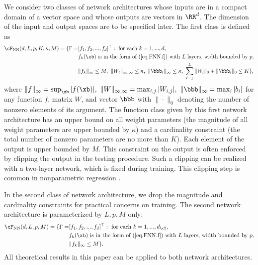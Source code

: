 \documentclass[11pt]{article} %
\newcommand{\hao}[1]{{\color{blue} #1}}
\begin{document}
We consider two classes of network architectures whose inputs are in a compact domain of a vector space and whose outputs are vectors in $\RR^d$. The dimension of the input and output spaces are to be specified later. The first class is defined as
\begin{align}
	\cF_{\rm NN}(d,L,p,K,\kappa,M)=\{\Gamma=&[f_1, f_2,...,f_{d}]^{\top}: \mbox{ for each }k=1,...,d,\nonumber\\
	&f_k(\xb) \mbox{ is in the form of (\ref{eq.FNN.f}) with } L \mbox{ layers, width bounded by } p, \nonumber\\
	& \|f_k\|_{\infty}\leq M, \ \|W_l\|_{\infty,\infty}\leq \kappa, \ \|\bbb_l\|_{\infty}\leq \kappa,\  \sum_{l=1}^L \|W_l\|_0+\|\bbb_l\|_0\leq K   \},
	\label{eq.FNN}
\end{align}
where
$
\|f\|_{\infty}=\sup_{\xb} |f(\xb)|,\ \|W\|_{\infty,\infty}=\max_{i,j} |W_{i,j}|,\ \|\bbb\|_{\infty}=\max_i |b_i|
$
for any function $f$, matrix $W$, and vector $\bbb$ with $\|\cdot\|_0$ denoting the number of nonzero elements of its argument. 
%
The function class given by this first network architecture has an upper bound on all weight parameters (the magnitude of all weight parameters are upper bounded by $\kappa$) and a cardinality constraint (the total number of nonzero parameters are no more than $K$). Each element of the output is upper bounded by $M$. This constraint on the output is often enforced by clipping the output in the testing procedure. Such a clipping can be realized with a two-layer network, which is fixed during training. This clipping step is common in nonparametric regression \citep{gyorfi2002distribution}.


In the second class of network architecture, we drop the magnitude and cardinality constraints for practical concerns on training. The second network architecture is parameterized by $L,p,M$ only:
\begin{align}
	\cF_{\rm NN}(d,L,p,M)=\{\Gamma=&[f_1, f_2,...,f_{d}]^{\top}: \mbox{ for each }k=1,...,d_{\cY},\nonumber\\
	&f_k(\xb) \mbox{ is in the form of (\ref{eq.FNN.f}) with } L \mbox{ layers, width bounded by } p, \nonumber\\
	& \|f_k\|_{\infty}\leq M\}.
	\label{eq.FNN.dense}
\end{align}
All theoretical results in this paper can be applied to both network architectures.
\end{document}
